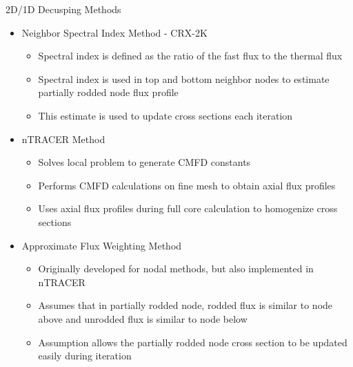 \begin{frame}[t]{2D/1D Decusping Methods}
    
    \begin{itemize}
        \item Neighbor Spectral Index Method - CRX-2K 
        \cite{cho2015CRX2d1dFusionDecusping}
        \begin{itemize}
            \item Spectral index is defined as the ratio of the fast flux to the 
            thermal flux
            \item Spectral index is used in top and bottom neighbor nodes to 
            estimate partially rodded node flux profile
            \item This estimate is used to update cross sections 
            each iteration
        \end{itemize}
        \item nTRACER Method \cite{ICAPPcontrolRodDecuspingNTRACER}
        \begin{itemize}
            \item Solves local problem to generate CMFD constants
            \item Performs CMFD calculations on fine mesh to obtain axial flux 
            profiles
            \item Uses axial flux profiles during full core calculation to 
            homogenize cross sections
        \end{itemize}
        \item Approximate Flux Weighting Method \cite{gehinThesis1992quasi}
        \begin{itemize}
            \item Originally developed for nodal methods, but also implemented in nTRACER \cite{Ryu2017nTRACERWholeCoreTransportSolutionstoC5G7-TDBenchmark}
            \item Assumes that in partially rodded node, rodded flux is similar to node above and unrodded flux is similar to node below
            \item Assumption allows the partially rodded node cross section to be updated easily during iteration
        \end{itemize}
    \end{itemize}
    
\end{frame}

